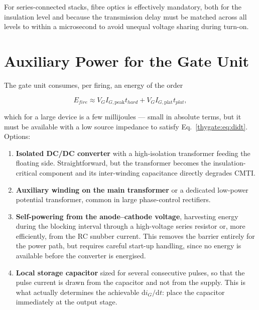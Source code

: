 For series-connected stacks, fibre optics is effectively mandatory, both for the
insulation level and because the transmission delay must be matched across all
levels to within a microsecond to avoid unequal voltage sharing during turn-on.

\section{Auxiliary Power for the Gate Unit}

The gate unit consumes, per firing, an energy of the order

\begin{equation}
  E_{fire} \approx V_G I_{G,\text{peak}} t_{hard} + V_G I_{G,\text{plat}} t_{plat},
\end{equation}

which for a large device is a few millijoules --- small in absolute terms, but it
must be available with a low source impedance to satisfy
Eq.~\eqref{thygate:eq:didt}. Options:

\begin{enumerate}
  \item \textbf{Isolated DC/DC converter} with a high-isolation transformer feeding
        the floating side. Straightforward, but the transformer becomes the
        insulation-critical component and its inter-winding capacitance directly
        degrades CMTI.
  \item \textbf{Auxiliary winding on the main transformer} or a dedicated
        low-power potential transformer, common in large phase-control rectifiers.
  \item \textbf{Self-powering from the anode--cathode voltage}, harvesting energy
        during the blocking interval through a high-voltage series resistor or,
        more efficiently, from the RC snubber current. This removes the barrier
        entirely for the power path, but requires careful start-up handling, since
        no energy is available before the converter is energised.
  \item \textbf{Local storage capacitor} sized for several consecutive pulses, so
        that the pulse current is drawn from the capacitor and not from the supply.
        This is what actually determines the achievable
        $\mathrm{d}i_G/\mathrm{d}t$: place the capacitor immediately at the output
        stage.
\end{enumerate}

